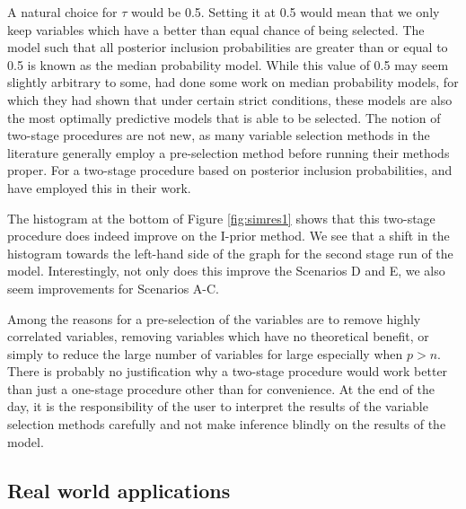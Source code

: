 
A natural choice for $\tau$ would be 0.5. Setting it at 0.5 would mean that we only keep variables which have a better than equal chance of being selected. The model such that all posterior inclusion probabilities are greater than or equal to 0.5 is known as the median probability model. While this value of 0.5 may seem slightly arbitrary to some, \cite{Barbieri2004} had done some work on median probability models, for which they had shown that under certain strict conditions, these models are also the most optimally predictive models that is able to be selected. The notion of two-stage procedures are not new, as many variable selection methods in the literature generally employ a pre-selection method before running their methods proper. For a two-stage procedure based on posterior inclusion probabilities, \cite{Fouskakis2008} and \cite{Ntzoufras2008} have employed this in their work.

The histogram at the bottom of Figure \ref{fig:simres1} shows that this two-stage procedure does indeed improve on the I-prior method. We see that a shift in the histogram towards the left-hand side of the graph for the second stage run of the model. Interestingly, not only does this improve the Scenarios D and E, we also seem improvements for Scenarios A-C. 

\begin{remark}
	Among the reasons for a pre-selection of the variables are to remove highly correlated variables, removing variables which have no theoretical benefit, or simply to reduce the large number of variables for large especially when $p > n$. There is probably no justification why a two-stage procedure would work better than just a one-stage procedure other than for convenience. At the end of the day, it is the responsibility of the user to interpret the results of the variable selection methods carefully and not make inference blindly on the results of the model.
\end{remark}

\subsection{Real world applications}

